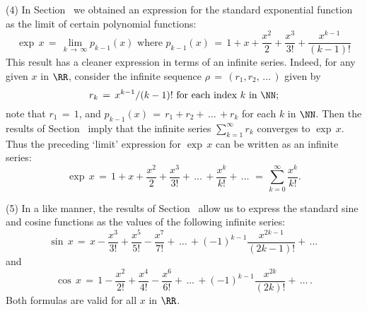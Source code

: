 \V

        (4) In Section~ we obtained an expression for the standard exponential function as the limit of certain polynomial functions:
        \begin{displaymath}
        \exp\,x \,=\, \lim_{k \,{\rightarrow}\, {\infty}} p_{k-1}(x) \mbox{ where } p_{k-1}(x) \,=\, 1+x+\frac{x^{2}}{2}+\frac{x^{3}}{3!}+\frac{x^{k-1}}{(k-1)!}
        \end{displaymath}
    This result has a cleaner expression in terms of an infinite series. Indeed, for any given $x$ in ${\RR}$, consider the infinite sequence ${\rho} \,=\, (r_{1},r_{2},\,{\ldots}\,)$ given by
        \begin{displaymath}
        r_{k} \,=\, x^{k-1}/(k-1)! \mbox{ for each index $k$ in ${\NN}$};
        \end{displaymath}
    note that $r_{1} \,=\, 1$, and $p_{k-1}(x) \,=\, r_{1} + r_{2} + \,{\ldots}\, + r_{k}$ for each $k$ in ${\NN}$.
    Then the results of Section~ imply that the infinite series $\sum_{k=1}^{{\infty}} r_{k}$ converges to $\exp\,x$.
    Thus the preceding `limit' expression for ${\exp}\,x$ can be written as an infinite series:
        \begin{displaymath}
        \exp\,x \,=\, 1+x+\frac{x^{2}}{2} + \frac{x^{3}}{3!} + \,{\ldots}\,+ \frac{x^{k}}{k!} + \,{\ldots}\, \,=\, \sum_{k=0}^{{\infty}} \frac{x^{k}}{k!}.
        \end{displaymath}

\V

        (5) In a like manner, the results of Section~ allow us to express the standard sine and cosine functions as the values of the following infinite series:
        \begin{displaymath}
        {\sin}\,x \,=\, x - \frac{x^{3}}{3!} + \frac{x^{5}}{5!} - \frac{x^{7}}{7!} + \,{\ldots}\,+ (-1)^{k-1}\frac{x^{2k-1}}{(2k-1)!} + \,{\ldots}\,
        \end{displaymath}
    and
        \begin{displaymath}
        {\cos}\,x \,=\, 1 - \frac{x^{2}}{2!} + \frac{x^{4}}{4!} - \frac{x^{6}}{6!} + \,{\ldots}\,+ (-1)^{k-1}\frac{x^{2k}}{(2k)!} + \,{\ldots}\,.
        \end{displaymath}
    Both formulas are valid for all $x$ in ${\RR}$.

\V


